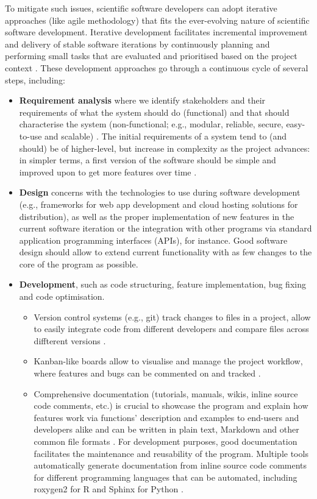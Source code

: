 
To mitigate such issues, scientific software developers can adopt iterative approaches (like agile methodology) that fits the ever-evolving nature of scientific software development. Iterative development facilitates incremental improvement and delivery of stable software iterations by continuously planning and performing small tasks that are evaluated and prioritised based on the project context \cite{storer:2017tr,silva:2017wl,dyba:2009tc}. These development approaches go through a continuous cycle of several steps, including:

\begin{itemize}
    \item{\textbf{Requirement analysis} where we identify stakeholders and their requirements of what the system should do (functional) and that should characterise the system (non-functional; e.g., modular, reliable, secure, easy-to-use and scalable) \cite{silva:2017wl,hewitt:2019uj}. The initial requirements of a system tend to (and should) be of higher-level, but increase in complexity as the project advances: in simpler terms, a first version of the software should be simple and improved upon to get more features over time \cite{silva:2017wl,kanat-alexander:2012ve}.}
    \item{\textbf{Design} concerns with the technologies to use during software development (e.g., frameworks for web app development and cloud hosting solutions for distribution), as well as the proper implementation of new features in the current software iteration or the integration with other programs via standard application programming interfaces (APIs), for instance. Good software design should allow to extend current functionality with as few changes to the core of the program as possible.}
	\item{\textbf{Development}, such as code structuring, feature implementation, bug fixing and code optimisation.}
	\begin{itemize}
	    \item Version control systems (e.g., git) track changes to files in a project, allow to easily integrate code from different developers and compare files across diffterent versions \cite{silva:2017wl,ford:2021ub}.
		\item Kanban-like boards allow to visualise and manage the project workflow, where features and bugs can be commented on and tracked \cite{silva:2017wl,hewitt:2019uj}.
		\item Comprehensive documentation (tutorials, manuals, wikis, inline source code comments, etc.) is crucial to showcase the program and explain how features work via functions' description and examples to end-users and developers alike and can be written in plain text, Markdown and other common file formats \cite{storer:2017tr,silva:2017wl,kanat-alexander:2012ve,ford:2021ub}. For development purposes, good documentation facilitates the maintenance and reusability of the program. Multiple tools automatically generate documentation from inline source code comments for different programming languages that can be automated, including roxygen2 for R \cite{wickham:2021wt} and Sphinx for Python \cite{silva:2017wl,hewitt:2019uj}.

\end{itemize}
\end{itemize}
